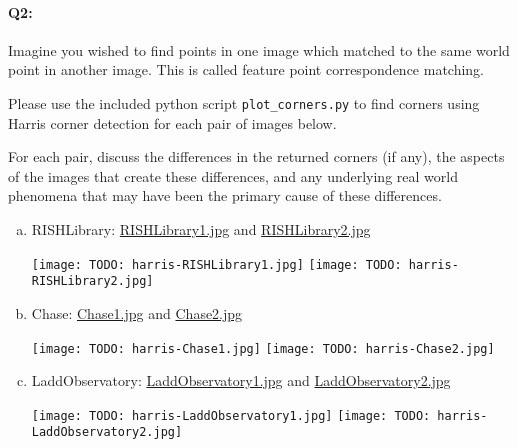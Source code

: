 \paragraph{Q2:} Imagine you wished to find points in one image which matched to the same world point in another image. This is called feature point correspondence matching.

Please use the included python script \texttt{plot\_corners.py} to find corners using Harris corner detection for each pair of images below. 

For each pair, discuss the differences in the returned corners (if any), the aspects of the images that create these differences, and any underlying real world phenomena that may have been the primary cause of these differences.

\begin{enumerate}[(a)]
    \item 
RISHLibrary: 
\href{images/RISHLibrary1.jpg}{RISHLibrary1.jpg} and \href{images/RISHLibrary2.jpg}{RISHLibrary2.jpg} 

\texttt{[image: TODO: harris-RISHLibrary1.jpg]}
\texttt{[image: TODO: harris-RISHLibrary2.jpg]}


    \item 
Chase:
\href{images/Chase1.jpg}{Chase1.jpg} and \href{images/Chase2.jpg}{Chase2.jpg}

\texttt{[image: TODO: harris-Chase1.jpg]}
\texttt{[image: TODO: harris-Chase2.jpg]}


    \item 
LaddObservatory: 
\href{images/LaddObservatory1.jpg}{LaddObservatory1.jpg} and \href{images/LaddObservatory2.jpg}{LaddObservatory2.jpg}

\texttt{[image: TODO: harris-LaddObservatory1.jpg]}
\texttt{[image: TODO: harris-LaddObservatory2.jpg]}


\end{enumerate}







